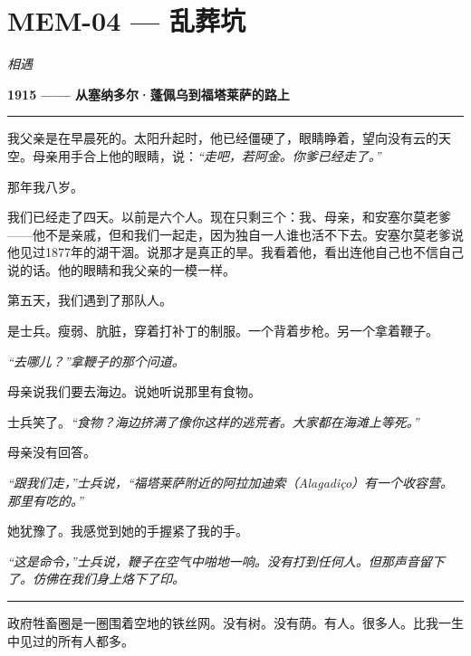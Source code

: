 \section*{\textbf{MEM-04} --- 乱葬坑}

\noindent \textit{相遇}

\noindent \textbf{1915 —— 从塞纳多尔·蓬佩乌到福塔莱萨的路上}

\vspace{0.5em}\noindent\rule{\textwidth}{0.5pt}\vspace{0.5em}

\noindent 我父亲是在早晨死的。太阳升起时，他已经僵硬了，眼睛睁着，望向没有云的天空。母亲用手合上他的眼睛，说：\textit{“走吧，若阿金。你爹已经走了。”}

\noindent 那年我八岁。

\noindent 我们已经走了四天。以前是六个人。现在只剩三个：我、母亲，和安塞尔莫老爹——他不是亲戚，但和我们一起走，因为独自一人谁也活不下去。安塞尔莫老爹说他见过1877年的湖干涸。说那才是真正的旱。我看着他，看出连他自己也不信自己说的话。他的眼睛和我父亲的一模一样。

\noindent 第五天，我们遇到了那队人。

\noindent 是士兵。瘦弱、肮脏，穿着打补丁的制服。一个背着步枪。另一个拿着鞭子。

\noindent \textit{“去哪儿？”拿鞭子的那个问道。}

\noindent 母亲说我们要去海边。说她听说那里有食物。

\noindent 士兵笑了。\textit{“食物？海边挤满了像你这样的逃荒者。大家都在海滩上等死。”}

\noindent 母亲没有回答。

\noindent \textit{“跟我们走，”士兵说，“福塔莱萨附近的阿拉加迪索（Alagadiço）有一个收容营。那里有吃的。”}

\noindent 她犹豫了。我感觉到她的手握紧了我的手。

\noindent \textit{“这是命令，”士兵说，鞭子在空气中啪地一响。没有打到任何人。但那声音留下了。仿佛在我们身上烙下了印。}

\vspace{0.5em}\noindent\rule{\textwidth}{0.5pt}\vspace{0.5em}

\noindent 政府牲畜圈是一圈围着空地的铁丝网。没有树。没有荫。有人。很多人。比我一生中见过的所有人都多。

